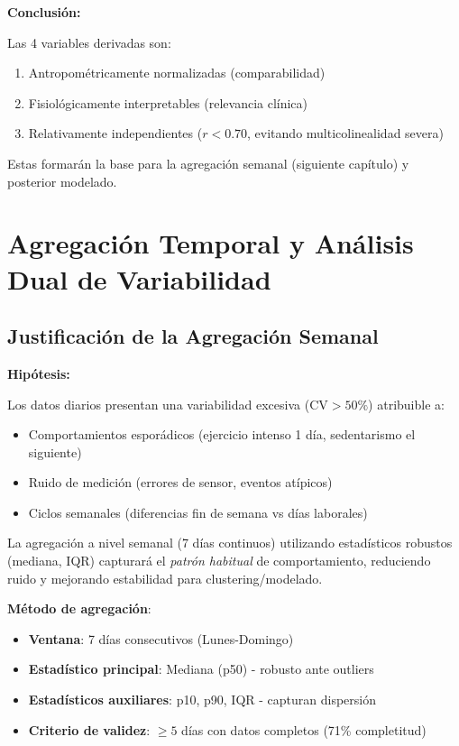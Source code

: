 \documentclass[12pt,letterpaper,twoside]{report}
\begin{document}
\begin{conclusionbox}
\textbf{Conclusión:}

Las 4 variables derivadas son:
\begin{enumerate}[noitemsep]
    \item Antropométricamente normalizadas (comparabilidad)
    \item Fisiológicamente interpretables (relevancia clínica)
    \item Relativamente independientes ($r < 0.70$, evitando multicolinealidad severa)
\end{enumerate}

Estas formarán la base para la agregación semanal (siguiente capítulo) y posterior modelado.
\end{conclusionbox}

\chapter{Agregación Temporal y Análisis Dual de Variabilidad}

\section{Justificación de la Agregación Semanal}

\begin{hipotesisbox}
\textbf{Hipótesis:}

Los datos diarios presentan una variabilidad excesiva ($\text{CV} > 50\%$) atribuible a:
\begin{itemize}[noitemsep]
    \item Comportamientos esporádicos (ejercicio intenso 1 día, sedentarismo el siguiente)
    \item Ruido de medición (errores de sensor, eventos atípicos)
    \item Ciclos semanales (diferencias fin de semana vs días laborales)
\end{itemize}

La agregación a nivel semanal (7 días continuos) utilizando estadísticos robustos (mediana, IQR) capturará el \textit{patrón habitual} de comportamiento, reduciendo ruido y mejorando estabilidad para clustering/modelado.
\end{hipotesisbox}

\begin{estadisticobox}
\textbf{Método de agregación}:

\begin{itemize}[noitemsep]
    \item \textbf{Ventana}: 7 días consecutivos (Lunes-Domingo)
    \item \textbf{Estadístico principal}: Mediana (p50) - robusto ante outliers
    \item \textbf{Estadísticos auxiliares}: p10, p90, IQR - capturan dispersión
    \item \textbf{Criterio de validez}: $\geq 5$ días con datos completos (71\% completitud)
\end{itemize}
\end{estadisticobox}
\end{document}
